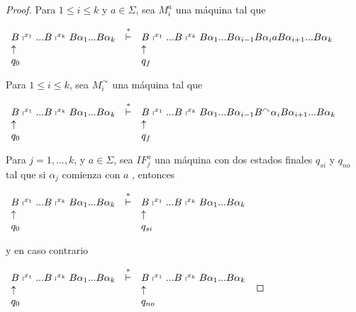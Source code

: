 \begin{proof}
		\bigskip


    \noindent Para $1\leq i\leq k$ y $a\in \Sigma $, sea $M_{i}^{a}$ una máquina tal que

		\bigskip


    $\displaystyle \begin{array}{lcl} B\shortmid ^{x_{1}}...B\shortmid ^{x_{k}}B\alpha _{1}...B\alpha _{k} &
    \overset{\ast }{\vdash } & B\shortmid ^{x_{1}}...B\shortmid ^{x_{k}}B\alpha _{1}...B\alpha _{i-1}B\alpha
    _{i}aB\alpha _{i+1}...B\alpha _{k} \\ \uparrow & & \uparrow \\ q_{0} & & q_{f} \end{array} $

		\bigskip

    \noindent Para $1\leq i\leq k$, sea $M_{i}^{\curvearrowright }$ una máquina tal que

    $\displaystyle \begin{array}{lcl} B\shortmid ^{x_{1}}...B\shortmid ^{x_{k}}B\alpha _{1}...B\alpha _{k} &
    \overset{\ast }{\vdash } & B\shortmid ^{x_{1}}...B\shortmid ^{x_{k}}B\alpha _{1}...B\alpha _{i-1}B
    ^{\curvearrowright }\alpha _{i}B\alpha _{i+1}...B\alpha _{k} \\ \uparrow & & \uparrow \\ q_{0} & & q_{f} \end{array} $

		\bigskip

    \noindent Para $j=1,...,k$, y $a\in \Sigma $, sea $IF_{j}^{a}$ una máquina con dos estados finales $q_{si}$ y
    $q_{no}$ tal que si $\alpha _{j}$ comienza con $a$ , entonces

		\bigskip

    $\displaystyle \begin{array}{lcl} B\shortmid ^{x_{1}}...B\shortmid ^{x_{k}}B\alpha _{1}...B\alpha _{k} &
    \overset{\ast }{\vdash } & B\shortmid ^{x_{1}}...B\shortmid ^{x_{k}}B\alpha _{1}...B\alpha _{k} \\
    \uparrow & & \uparrow \\ q_{0} & & q_{si} \end{array} $

    \noindent y en caso contrario

		\bigskip

    $\displaystyle \begin{array}{lcl} B\shortmid ^{x_{1}}...B\shortmid ^{x_{k}}B\alpha _{1}...B\alpha _{k} &
    \overset{\ast }{\vdash } & B\shortmid ^{x_{1}}...B\shortmid ^{x_{k}}B\alpha _{1}...B\alpha _{k} \\
    \uparrow & & \uparrow \\ q_{0} & & q_{no} \end{array} $


\end{proof}
